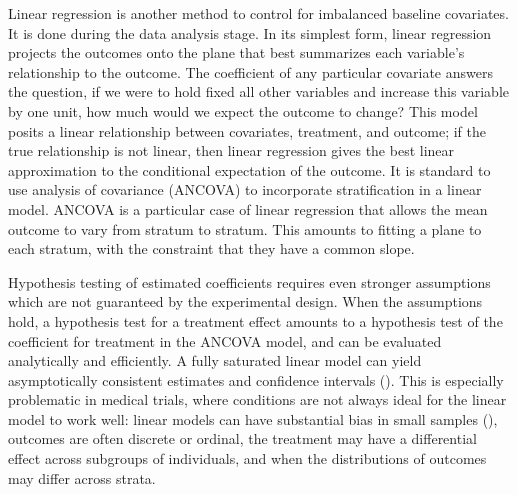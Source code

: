 \documentclass[12pt]{article}
\begin{document}
Linear regression is another method to control for imbalanced baseline covariates.
It is done during the data analysis stage.
In its simplest form, linear regression projects the outcomes onto the plane that best summarizes each variable's relationship to the outcome.
The coefficient of any particular covariate answers the question, if we were to hold fixed all other variables and increase this variable by one unit, how much would we expect the outcome to change?
This model posits a linear relationship between covariates, treatment, and outcome; 
if the true relationship is not linear, then linear regression gives the best linear approximation to the conditional expectation of the outcome.
It is standard to use analysis of covariance (ANCOVA) to incorporate stratification in a linear model.
ANCOVA is a particular case of linear regression that allows the mean outcome to vary from stratum to stratum.
This amounts to fitting a plane to each stratum, with the constraint that they have a common slope.

Hypothesis testing of estimated coefficients requires even stronger assumptions which are not guaranteed by the experimental design.
When the assumptions hold, a hypothesis test for a treatment effect amounts to a hypothesis test of the coefficient for treatment in the ANCOVA model, and can be evaluated analytically and efficiently.
A fully saturated linear model can yield asymptotically consistent estimates and confidence intervals (\cite{lin_agnostic_2013}).
This is especially problematic in medical trials, where conditions are not always ideal for the linear model to work well:
linear models can have substantial bias in small samples (\cite{freedman_regression_2008}),
outcomes are often discrete or ordinal, 
the treatment may have a differential effect across subgroups of individuals, 
and when the distributions of outcomes may differ across strata.
\end{document}
